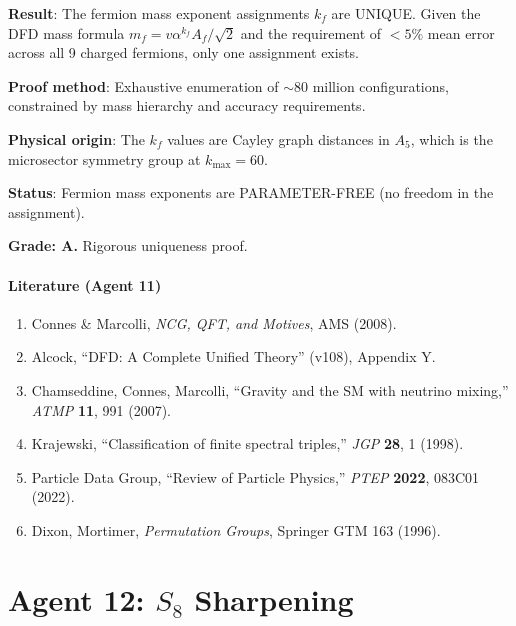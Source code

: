 \documentclass[11pt,a4paper]{article}
\begin{document}
\begin{tcolorbox}[colback=green!5!white, colframe=green!60!black, title={Agent 11: $k_f$ Uniqueness --- PROVED}]
\textbf{Result}: The fermion mass exponent assignments $k_f$ are UNIQUE. Given the DFD mass formula $m_f = v\alpha^{k_f}A_f/\sqrt{2}$ and the requirement of $< 5\%$ mean error across all 9 charged fermions, only one assignment exists.

\textbf{Proof method}: Exhaustive enumeration of $\sim 80$ million configurations, constrained by mass hierarchy and accuracy requirements.

\textbf{Physical origin}: The $k_f$ values are Cayley graph distances in $A_5$, which is the microsector symmetry group at $k_{\max} = 60$.

\textbf{Status}: Fermion mass exponents are PARAMETER-FREE (no freedom in the assignment).

\textbf{Grade: A.} Rigorous uniqueness proof.
\end{tcolorbox}

\subsection{Literature (Agent 11)}

\begin{enumerate}
\item Connes \& Marcolli, \textit{NCG, QFT, and Motives}, AMS (2008).
\item Alcock, ``DFD: A Complete Unified Theory'' (v108), Appendix Y.
\item Chamseddine, Connes, Marcolli, ``Gravity and the SM with neutrino mixing,'' \textit{ATMP} \textbf{11}, 991 (2007).
\item Krajewski, ``Classification of finite spectral triples,'' \textit{JGP} \textbf{28}, 1 (1998).
\item Particle Data Group, ``Review of Particle Physics,'' \textit{PTEP} \textbf{2022}, 083C01 (2022).
\item Dixon, Mortimer, \textit{Permutation Groups}, Springer GTM 163 (1996).
\end{enumerate}


\part{Agent 12: $S_8$ Sharpening}
\label{part:s8-sharpen}
\end{document}

